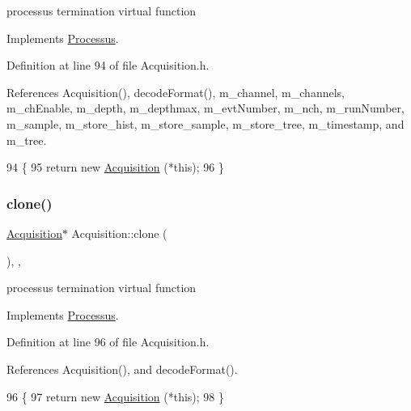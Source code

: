 processus termination virtual function 

Implements \hyperlink{classProcessus_aca8856f6d6d7b7e1fe941f298dcbb502}{Processus}.



Definition at line 94 of file Acquisition.\+h.



References Acquisition(), decode\+Format(), m\+\_\+channel, m\+\_\+channels, m\+\_\+ch\+Enable, m\+\_\+depth, m\+\_\+depthmax, m\+\_\+evt\+Number, m\+\_\+nch, m\+\_\+run\+Number, m\+\_\+sample, m\+\_\+store\+\_\+hist, m\+\_\+store\+\_\+sample, m\+\_\+store\+\_\+tree, m\+\_\+timestamp, and m\+\_\+tree.


\begin{DoxyCode}
94                       \{
95     \textcolor{keywordflow}{return} \textcolor{keyword}{new} \hyperlink{classAcquisition_aa7d3138495a4a8888c21b33f4d657732}{Acquisition} (*\textcolor{keyword}{this});
96   \}
\end{DoxyCode}
\mbox{\label{classAcquisition_a4b1b690ef27f20b3e1ad9383f2f57628}} 
\subsubsection{\texorpdfstring{clone()}{clone()}\hspace{0.1cm}{\footnotesize\ttfamily [2/2]}}
{\footnotesize\ttfamily \hyperlink{classAcquisition_1_1Acquisition}{Acquisition}$\ast$ Acquisition\+::clone (\begin{DoxyParamCaption}{ }\end{DoxyParamCaption})\hspace{0.3cm}{\ttfamily [inline]}, {\ttfamily [protected]}, {\ttfamily [virtual]}}

processus termination virtual function 

Implements \hyperlink{classProcessus_aca8856f6d6d7b7e1fe941f298dcbb502}{Processus}.



Definition at line 96 of file Acquisition.\+h.



References Acquisition(), and decode\+Format().


\begin{DoxyCode}
96                       \{
97     \textcolor{keywordflow}{return} \textcolor{keyword}{new} \hyperlink{classAcquisition_aa7d3138495a4a8888c21b33f4d657732}{Acquisition} (*\textcolor{keyword}{this});
98   \}
\end{DoxyCode}
\mbox{\label{classProcessus_a2f3c41e99da4c738ea3d8f7b0d20a665}} 
